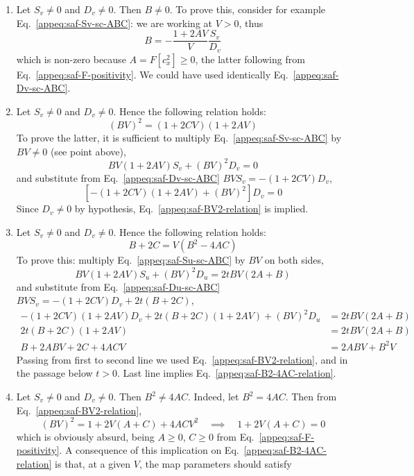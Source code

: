 \begin{enumerate}
	\item Let $S_v \neq 0$ and $D_v \neq 0$. Then $B \neq 0$. To prove this, consider for example Eq.~\eqref{appeq:saf-Sv-sc-ABC}: we are working at $V>0$, thus
	\[
	B = - \frac{1 + 2AV}{V} \frac{S_v}{D_v}
	\]
	which is non-zero because $A = F\left[c_x^2 \right] \ge 0$, the latter following from Eq.~\eqref{appeq:saf-F-positivity}. We could have used identically Eq.~\eqref{appeq:saf-Dv-sc-ABC}.
	\item Let $S_v \neq 0$ and $D_v \neq 0$. Hence the following relation holds:
	\begin{equation}\label{appeq:saf-BV2-relation}
		(BV)^2 = (1+2CV)(1+2AV)
	\end{equation}
	To prove the latter, it is sufficient to multiply Eq.~\eqref{appeq:saf-Sv-sc-ABC} by $BV \neq 0$ (see point above),
	\[
	BV (1+2AV) S_v + (BV)^2 D_v = 0
	\]
	and substitute from Eq.~\eqref{appeq:saf-Dv-sc-ABC} $BV S_v = - (1+2CV) D_v$,
	\[
	\left[- (1+2CV) (1+2AV) + (BV)^2\right] D_v = 0
	\]
	Since $D_v \neq 0$ by hypothesis, Eq.~\eqref{appeq:saf-BV2-relation} is implied.
	\item Let $S_v \neq 0$ and $D_v \neq 0$. Hence the following relation holds:
	\begin{equation}\label{appeq:saf-B2-4AC-relation}
		B+2C = V(B^2 - 4AC)
	\end{equation}
	To prove this: multiply Eq.~\eqref{appeq:saf-Su-sc-ABC} by $BV$ on both sides,
	\[
	BV (1+2AV) S_u + (BV)^2 D_u = 2t BV(2A+B)
	\]
	and substitute from Eq.~\eqref{appeq:saf-Du-sc-ABC} $BV S_v = - (1+2CV) D_v + 2t(B+2C)$,
	\[
	\begin{aligned}
		- (1+2CV)(1+2AV) D_v + 2t(B+2C)(1+2AV) + (BV)^2 D_u &= 2t BV(2A+B) \\
		2t(B+2C)(1+2AV) &= 2t BV(2A+B) \\
		B + 2ABV + 2C + 4ACV &= 2ABV + B^2 V
	\end{aligned}
	\]
	Passing from first to second line we used Eq.~\eqref{appeq:saf-BV2-relation}, and in the passage below $t>0$. Last line implies Eq.~\eqref{appeq:saf-B2-4AC-relation}.
	\item Let $S_v \neq 0$ and $D_v \neq 0$. Then $B^2 \neq 4AC$. Indeed, let $B^2 = 4AC$. Then from Eq.~\eqref{appeq:saf-BV2-relation},
	\[
	(BV)^2 = 1 + 2V (A+C) + 4ACV^2
	\quad\implies\quad
	1 + 2V (A+C) = 0
	\]
	which is obviously absurd, being $A\ge0$, $C\ge0$ from Eq.~\eqref{appeq:saf-F-positivity}. A consequence of this implication on Eq.~\eqref{appeq:saf-B2-4AC-relation} is that, at a given $V$, the map parameters should satisfy

\end{enumerate}
